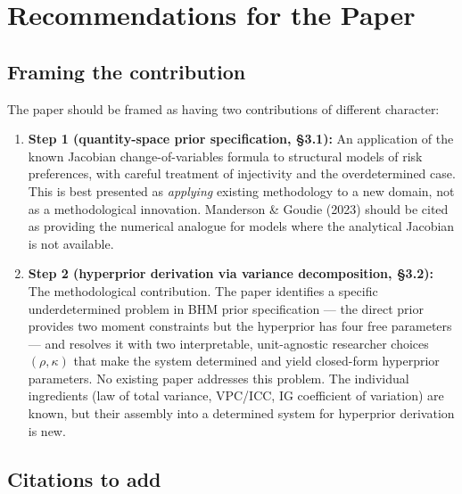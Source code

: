 \documentclass[12pt,a4paper]{article}
\begin{document}
\section{Recommendations for the Paper}

\subsection{Framing the contribution}

The paper should be framed as having two contributions of different character:

\begin{enumerate}
  \item \textbf{Step 1 (quantity-space prior specification, \S3.1):} An
    application of the known Jacobian change-of-variables formula to structural
    models of risk preferences, with careful treatment of injectivity and the
    overdetermined case. This is best presented as \emph{applying} existing
    methodology to a new domain, not as a methodological innovation. Manderson
    \& Goudie (2023) should be cited as providing the numerical analogue for
    models where the analytical Jacobian is not available.

  \item \textbf{Step 2 (hyperprior derivation via variance decomposition,
    \S3.2):} The methodological contribution. The paper identifies a specific
    underdetermined problem in BHM prior specification --- the direct prior
    provides two moment constraints but the hyperprior has four free parameters
    --- and resolves it with two interpretable, unit-agnostic researcher
    choices $(\rho, \kappa)$ that make the system determined and yield
    closed-form hyperprior parameters. No existing paper addresses this
    problem. The individual ingredients (law of total variance, VPC/ICC, IG
    coefficient of variation) are known, but their assembly into a determined
    system for hyperprior derivation is new.
\end{enumerate}

\subsection{Citations to add}
\end{document}
